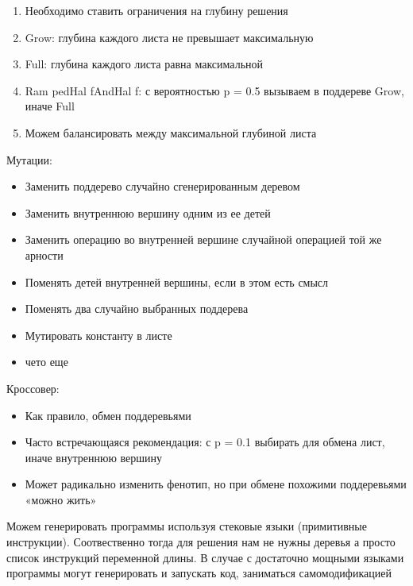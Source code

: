 \begin{enumerate} 
	\item Необходимо ставить ограничения на глубину решения 
	\item Grow: глубина каждого листа не превышает максимальную
	\item Full: глубина каждого листа равна максимальной
	\item Ram pedHal fAndHal f: с вероятностью p = 0.5 вызываем в поддереве Grow, иначе Full
	\item Можем балансировать между максимальной глубиной листа
\end{enumerate} 
Мутации:
\begin{itemize}
	\item Заменить поддерево случайно сгенерированным деревом
	\item Заменить внутреннюю вершину одним из ее детей
	\item Заменить операцию во внутренней вершине случайной операцией той же арности
	\item Поменять детей внутренней вершины, если в этом есть смысл
	\item Поменять два случайно выбранных поддерева
	\item Мутировать константу в листе
	\item чето еще
\end{itemize}
Кроссовер:
\begin{itemize}
	\item Как правило, обмен поддеревьями
	\item Часто встречающаяся рекомендация: с p = 0.1 выбирать для обмена лист, иначе внутреннюю вершину
	\item Может радикально изменить фенотип, но при обмене похожими поддеревьями «можно жить»
\end{itemize}
Можем генерировать программы используя стековые языки (примитивные инструкции). 
Соотвественно тогда для решения нам не нужны деревья а просто список инструкций переменной длины. 
В случае с достаточно мощными языками программы могут генерировать и запускать код, заниматься самомодификацией
